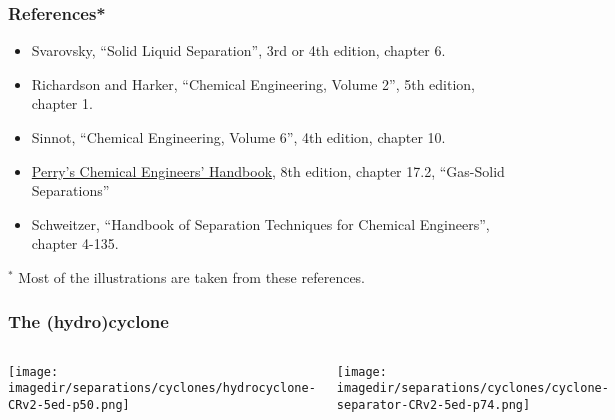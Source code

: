 
\begin{frame}\frametitle{References*}
	\begin{itemize}
		\item	Svarovsky, ``Solid Liquid Separation'', 3rd or 4th edition, chapter 6.%
		\item	Richardson and Harker, ``Chemical Engineering, Volume 2'', 5th edition, chapter 1.
		\item	Sinnot, ``Chemical Engineering, Volume 6'', 4th edition, chapter 10.
		\item	\href{http://accessengineeringlibrary.com/browse/perrys-chemical-engineers-handbook-eighth-edition}{Perry's Chemical Engineers' Handbook}, 8th edition, chapter 17.2, ``Gas-Solid Separations''
		\item	Schweitzer, ``Handbook of Separation Techniques for Chemical Engineers'', chapter 4-135.
	\end{itemize}
	
	\vspace{1cm}
	\small{$^\ast$ Most of the illustrations are taken from these references.}
\end{frame}

\begin{frame}\frametitle{The (hydro)cyclone}
	\vspace{-24pt}
	\begin{columns}[b]
			\begin{center}
				\texttt{[image: \\imagedir/separations/cyclones/hydrocyclone-CRv2-5ed-p50.png]}
			\end{center}
			
			\begin{center}
				\vspace{12pt}
				\texttt{[image: \\imagedir/separations/cyclones/cyclone-separator-CRv2-5ed-p74.png]}
			\end{center}
	\end{columns}
\end{frame}

